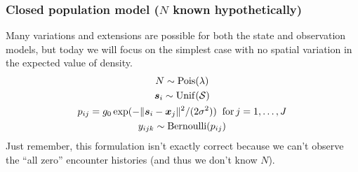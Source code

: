 \documentclass[color=usenames,dvipsnames]{beamer}\usepackage[]{graphicx}\usepackage[]{xcolor}
\begin{document}
\begin{frame}
  \frametitle{\large Closed population model ($N$ known hypothetically) }
  \footnotesize
  Many variations and extensions are possible for both the state and
  observation models, but today we will focus on the simplest case
  with no spatial variation in the expected value of density.
  \begin{gather*}
    N \sim \mathrm{Pois}(\lambda) \\
    {\bm s}_i \sim \mathrm{Unif}(\cal S) \\
    p_{ij} = g_0\exp(-\|{\bm s}_i - {\bm x}_j\|^2/(2\sigma^2))  \;\; \mathrm{for}\, j=1,\dots,J  \\
    y_{ijk} \sim \mathrm{Bernoulli}(p_{ij})
  \end{gather*}
  \pause
  \vfill
  Just remember, this formulation isn't exactly correct because we
  can't observe the ``all zero'' encounter histories (and thus we
  don't know $N$).
\end{frame}







\end{document}
